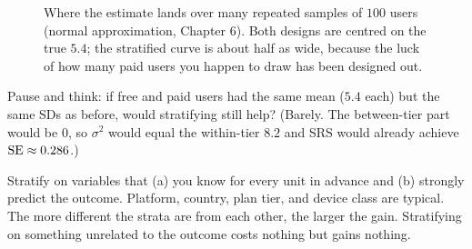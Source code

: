\begin{figure}[H]
\centering
{}
\caption{Where the estimate lands over many repeated samples of $100$ users (normal
approximation, Chapter 6). Both designs are centred on the true $5.4$; the stratified
curve is about half as wide, because the luck of how many paid users you happen to draw
has been designed out.}
\label{fig:sampling-strat-se}
\end{figure}

\begin{recoverybox}
Pause and think: if free and paid users had the same mean ($5.4$ each) but the same SDs
as before, would stratifying still help? (Barely. The between-tier part would be $0$, so
$\sigma^2$ would equal the within-tier $8.2$ and SRS would already achieve
$\operatorname{SE} \approx 0.286$.)
\end{recoverybox}

\begin{intuitionbox}
Stratify on variables that (a) you know for every unit in advance and (b) strongly
predict the outcome. Platform, country, plan tier, and device class are typical. The
more different the strata are from each other, the larger the gain. Stratifying on
something unrelated to the outcome costs nothing but gains nothing.
\end{intuitionbox}

